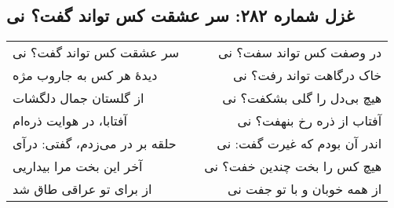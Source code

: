 \begin{center}
\section*{غزل شماره ۲۸۲: سر عشقت کس تواند گفت؟ نی}
\label{sec:282}
\begin{longtable}{l p{0.5cm} r}
سر عشقت کس تواند گفت؟ نی
&&
در وصفت کس تواند سفت؟ نی
\\
دیدهٔ هر کس به جاروب مژه
&&
خاک درگاهت تواند رفت؟ نی
\\
از گلستان جمال دلگشات
&&
هیچ بی‌دل را گلی بشکفت؟ نی
\\
آفتابا، در هوایت ذره‌ام
&&
آفتاب از ذره رخ بنهفت؟ نی
\\
حلقه بر در می‌زدم، گفتی: درآی
&&
اندر آن بودم که غیرت گفت: نی
\\
آخر این بخت مرا بیداریی
&&
هیچ کس را بخت چندین خفت؟ نی
\\
از برای تو عراقی طاق شد
&&
از همه خوبان و با تو جفت نی
\\
\end{longtable}
\end{center}
